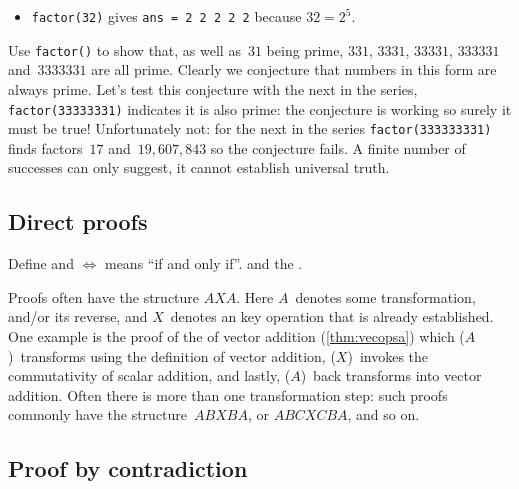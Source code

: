 \begin{draft}
\begin{example}
\begin{itemize}
\item \verb|factor(32)| gives \verb|ans = 2 2 2 2 2| because \(32=2^5\).
\end{itemize}
Use \verb|factor()| to show that, as well as~\(31\) being prime, \(331\), \(3331\), \(33331\), \(333331\) and~\(3333331\) are all prime.
Clearly we conjecture that numbers in this form are always prime.
Let's test this conjecture with the next in the series, \verb|factor(33333331)| indicates it is also prime: the conjecture is working so surely it must be true!
Unfortunately not: for the next in the series \verb|factor(333333331)| finds factors~\(17\) and~\(19,607,843\) so the conjecture fails.
A finite number of successes can only suggest, it cannot establish universal truth.
\end{example}









\subsection{Direct proofs}
\label{sec:dp}

\begin{comment}
Currently I only use ``iff'' from \S\ref{sec:iee} and thereafter.
Need to check on \(\iff\) use.
Define set notation, and in, and subset.
\end{comment}
Define  and \(\iff\) means ``if and only if''.
and the .

Proofs often have the structure \(AXA\).
Here \(A\)~denotes some transformation, and/or its reverse, and \(X\)~denotes an key operation that is already established.
One example is the proof of the  of vector addition (\autoref{thm:vecopsa}) which (\(A\))~transforms using the definition of vector addition,  (\(X\))~invokes the commutativity of scalar addition, and lastly, (\(A\))~back transforms into vector addition.
Often there is more than one transformation step: such proofs commonly have the structure~\(ABXBA\), or \(ABCXCBA\), and so on.



\begin{comment}
SEbooklet.pdf has a couple of examples, and a possible approach to describe in understanding proofs.
\end{comment}



\subsection{Proof by contradiction}
\label{sec:pc}


\end{draft}
